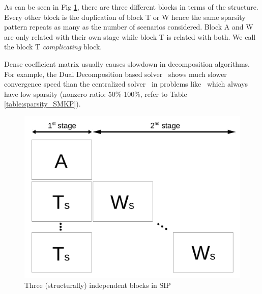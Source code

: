 

As can be seen in Fig \ref{fig:stagewise_sparsity}, there are three different blocks in terms of the structure. Every other block is the duplication of block T or W hence the same sparsity pattern repeats as many as the number of scenarios considered. Block A and W are only related with their own stage while block T is related with both. We call the block T \textit{complicating} block. 

Dense coefficient matrix usually causes slowdown in decomposition algorithms. For example, the Dual Decomposition based solver \dsp\ shows much slower convergence speed than the centralized solver \cplex\ in problems like \smkp\ which always have low sparsity (nonzero ratio: 50\%-100\%, refer to Table \ref{table:sparsity_SMKP}).
\begin{figure}
	\centering
	\includegraphics[width=0.7\linewidth]{drawings/stagewise_sparsity}
	\caption{Three (structurally) independent blocks in SIP}
	\label{fig:stagewise_sparsity}
\end{figure}









